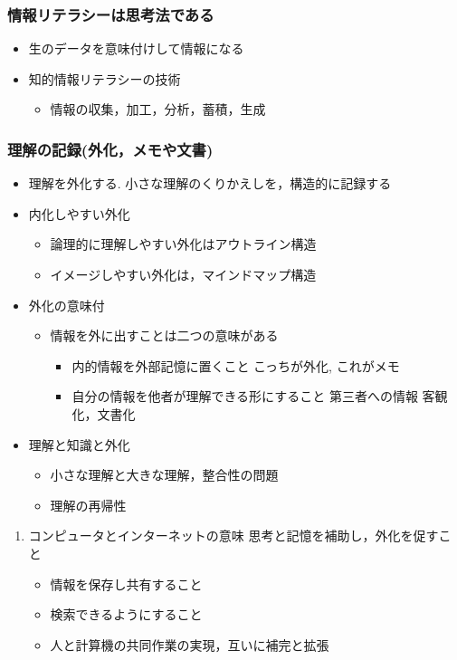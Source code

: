 \documentclass[dvipdfmx,11pat]{jarticle}
\begin{document}
\subsubsection{情報リテラシーは思考法である}
\label{sec:org562a511}
\begin{itemize}
\item 生のデータを意味付けして情報になる
\item 知的情報リテラシーの技術
\begin{itemize}
\item 情報の収集，加工，分析，蓄積，生成
\end{itemize}
\end{itemize}

\subsubsection{理解の記録(外化，メモや文書)}
\label{sec:org09bc5e1}
\begin{itemize}
\item 理解を外化する. 小さな理解のくりかえしを，構造的に記録する
\item 内化しやすい外化
\begin{itemize}
\item 論理的に理解しやすい外化はアウトライン構造
\item イメージしやすい外化は，マインドマップ構造
\end{itemize}
\item 外化の意味付
\begin{itemize}
\item 情報を外に出すことは二つの意味がある
\begin{itemize}
\item 内的情報を外部記憶に置くこと
こっちが外化, これがメモ
\item 自分の情報を他者が理解できる形にすること
第三者への情報 客観化，文書化
\end{itemize}
\end{itemize}

\item 理解と知識と外化
\begin{itemize}
\item 小さな理解と大きな理解，整合性の問題
\item 理解の再帰性
\end{itemize}
\end{itemize}

\begin{enumerate}
\item コンピュータとインターネットの意味
\label{sec:org9770713}
思考と記憶を補助し，外化を促すこと
\begin{itemize}
\item 情報を保存し共有すること
\item 検索できるようにすること
\item 人と計算機の共同作業の実現，互いに補完と拡張
\end{itemize}
\end{enumerate}
\end{document}
